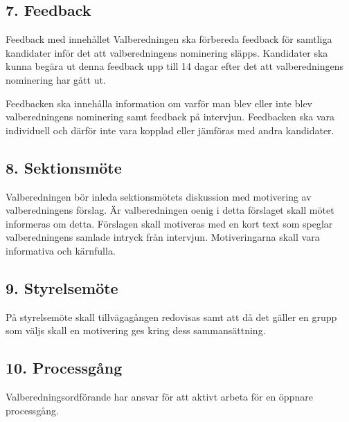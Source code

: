 \documentclass{dsekkallelse}
\begin{document}
\subsection{7. Feedback}
Feedback med innehållet Valberedningen ska förbereda feedback för samtliga kandidater inför det att valberedningens nominering
släpps. Kandidater ska kunna begära ut denna feedback upp till 14 dagar efter det att valberedningens nominering har gått ut.

Feedbacken ska innehålla information om varför man blev eller inte blev valberedningens nominering samt feedback på intervjun. Feedbacken ska vara individuell och därför inte vara kopplad eller
jämföras med andra kandidater.

\subsection{8. Sektionsmöte}
Valberedningen bör inleda sektionsmötets diskussion med motivering av valberedningens förslag. Är valberedningen oenig i detta förslaget skall mötet informeras om detta. Förslagen skall
motiveras med en kort text som speglar valberedningens samlade intryck från intervjun. Motiveringarna skall vara informativa och kärnfulla.

\subsection{9. Styrelsemöte}
På styrelsemöte skall tillvägagången redovisas samt att då det gäller en grupp som väljs skall
en motivering ges kring dess sammansättning.

\subsection{10. Processgång}
Valberedningsordförande har ansvar för att aktivt arbeta för en öppnare processgång.
\end{document}
